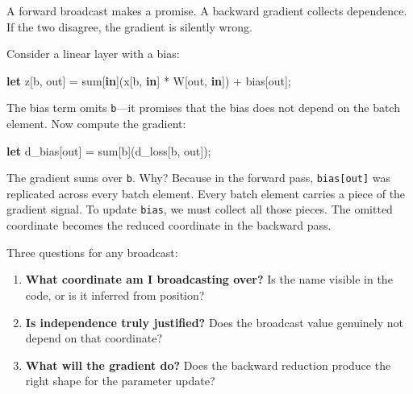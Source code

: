 \documentclass[11pt,titlepage]{article}
\newenvironment{Shaded}{}{}
\newcommand{\KeywordTok}[1]{\textcolor[rgb]{0.00,0.44,0.13}{\textbf{#1}}}
\newcommand{\NormalTok}[1]{#1}
\newcommand{\OperatorTok}[1]{\textcolor[rgb]{0.40,0.40,0.40}{#1}}
\providecommand{\tightlist}{%
  \setlength{\itemsep}{0pt}\setlength{\parskip}{0pt}}
\begin{document}
A forward broadcast makes a promise. A backward gradient collects
dependence. If the two disagree, the gradient is silently wrong.

Consider a linear layer with a bias:

\begin{Shaded}
\begin{Highlighting}[]
\KeywordTok{let}\NormalTok{ z}\OperatorTok{[}\NormalTok{b, out}\OperatorTok{]}\NormalTok{ = sum}\OperatorTok{[}\KeywordTok{in}\OperatorTok{]}\NormalTok{(x}\OperatorTok{[}\NormalTok{b, }\KeywordTok{in}\OperatorTok{]}\NormalTok{ * W}\OperatorTok{[}\NormalTok{out, }\KeywordTok{in}\OperatorTok{]}\NormalTok{) + bias}\OperatorTok{[}\NormalTok{out}\OperatorTok{]}\NormalTok{;}
\end{Highlighting}
\end{Shaded}

The bias term omits \texttt{b}---it promises that the bias does not
depend on the batch element. Now compute the gradient:

\begin{Shaded}
\begin{Highlighting}[]
\KeywordTok{let}\NormalTok{ d_bias}\OperatorTok{[}\NormalTok{out}\OperatorTok{]}\NormalTok{ = sum}\OperatorTok{[}\NormalTok{b}\OperatorTok{]}\NormalTok{(d_loss}\OperatorTok{[}\NormalTok{b, out}\OperatorTok{]}\NormalTok{);}
\end{Highlighting}
\end{Shaded}

The gradient sums over \texttt{b}. Why? Because in the forward pass,
\texttt{bias{[}out{]}} was replicated across every batch element. Every
batch element carries a piece of the gradient signal. To update
\texttt{bias}, we must collect all those pieces. The omitted coordinate
becomes the reduced coordinate in the backward pass.

Three questions for any broadcast:

\begin{enumerate}
\def\labelenumi{\arabic{enumi}.}
\tightlist
\item
  \textbf{What coordinate am I broadcasting over?} Is the name visible
  in the code, or is it inferred from position?
\item
  \textbf{Is independence truly justified?} Does the broadcast value
  genuinely not depend on that coordinate?
\item
  \textbf{What will the gradient do?} Does the backward reduction
  produce the right shape for the parameter update?
\end{enumerate}
\end{document}

